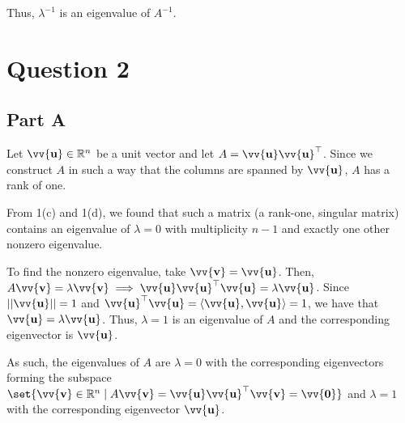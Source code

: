 \documentclass[12pt]{article}
\newcommand{\vect}[1]{\vv{\mathbf{#1}}}
\newcommand{\R}{\mathbb{R}}
\begin{document}
Thus, $\lambda^{-1}$ is an eigenvalue of $A^{-1}$.

\section*{Question 2}

\subsection*{Part A}

Let $\vect{u}\in\R^n$ be a unit vector and let $A=\vect{u}\vect{u}^\top$. Since we construct $A$ in such a way that the columns are spanned by $\vect{u}$, $A$ has a rank of one.

From 1(c) and 1(d), we found that such a matrix (a rank-one, singular matrix) contains an eigenvalue of $\lambda=0$ with multiplicity $n-1$ and exactly one other nonzero eigenvalue.

To find the nonzero eigenvalue, take $\vect{v}=\vect{u}$. Then, $A\vect{v} = \lambda\vect{v} \implies \vect{u}\vect{u}^\top\vect{u} = \lambda\vect{u}$. Since $||\vect{u}||=1$ and $\vect{u}^\top\vect{u}=\langle\vect{u},\vect{u}\rangle=1$, we have that $\vect{u}=\lambda\vect{u}$. Thus, $\lambda=1$ is an eigenvalue of $A$ and the corresponding eigenvector is $\vect{u}$.

As such, the eigenvalues of $A$ are $\lambda=0$ with the corresponding eigenvectors forming the subspace $\set{\vect{v}\in\R^n\mid A\vect{v}=\vect{u}\vect{u}^\top\vect{v}=\vect{0}}$ and $\lambda=1$ with the corresponding eigenvector $\vect{u}$.
\end{document}
